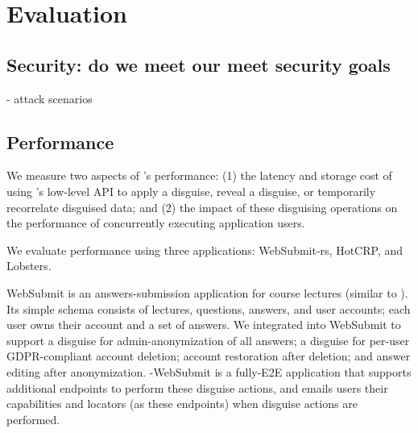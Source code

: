 \section{Evaluation}
\subsection{Security: do we meet our meet security goals}
   - attack scenarios

\subsection{Performance}

We measure two aspects of \sys's performance: (1) the latency and storage cost of using \sys's
low-level API to apply a disguise, reveal a disguise, or temporarily recorrelate disguised data; and
(2) the impact of these disguising operations on the performance of concurrently executing
application users.

We evaluate performance using three applications: WebSubmit-rs, HotCRP, and Lobsters.

WebSubmit is an answers-submission application for course lectures (similar to ). Its simple schema consists of lectures, questions, answers, and user
accounts; each user owns their account and a set of answers. We integrated \sys into WebSubmit to
support a disguise for admin-anonymization of all answers; a disguise for per-user GDPR-compliant
account deletion; account restoration after deletion; and answer editing after anonymization.
\sys-WebSubmit is a fully-E2E application that supports additional endpoints to perform these
disguise actions, and emails users their capabilities and locators (as these endpoints) when
disguise actions are performed.


